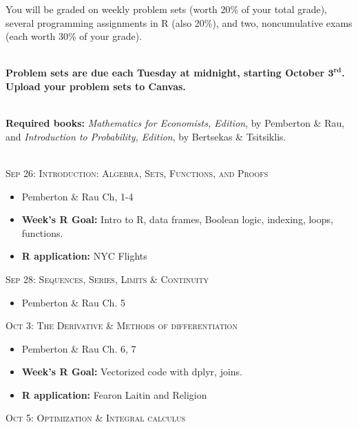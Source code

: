 \documentclass[11pt]{article}
\begin{document}
\vspace{.1in}

 You will be graded on weekly problem sets (worth 20\% of your total grade), several programming assignments in R (also 20\%), and two, noncumulative exams (each worth 30\% of your grade).  

\ \\{\bf Problem sets are due each Tuesday at midnight, starting October $\mathbf{3^{\text{rd}}}$.  Upload your problem sets to Canvas.}


\ \\{\bf Required books:} \textit{ Mathematics for Economists,  Edition},  by Pemberton \& Rau, and \textit{Introduction to Probability,  Edition}, by Bertsekas \& Tsitsiklis.


\newpage

\ \\ \noindent \textsc{Sep 26: Introduction: Algebra, Sets, Functions, and Proofs}

\begin{itemize}
\item Pemberton \& Rau Ch, 1-4

\item {\bf Week's R Goal:} Intro to R, data frames, Boolean logic, indexing, loops, functions.
\item {\bf R application: } NYC Flights
\end{itemize}


\noindent \textsc{Sep 28: Sequences, Series, Limits \& Continuity}

\begin{itemize}

\item Pemberton \& Rau Ch. 5


\end{itemize}

\noindent \textsc{Oct 3: The Derivative \& Methods of differentiation}

\begin{itemize}
\item Pemberton \& Rau Ch. 6, 7

\item {\bf Week's R Goal:} Vectorized code with dplyr, joins.
\item {\bf R application: } Fearon Laitin and Religion 
\end{itemize}



\noindent \textsc{Oct 5: Optimization \& Integral calculus}
\end{document}
